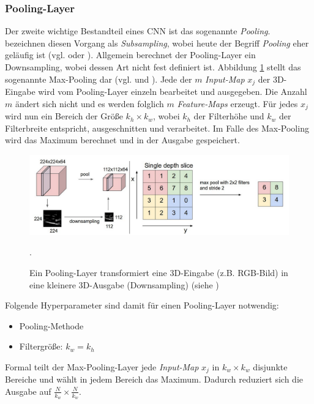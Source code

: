 \subsubsection{Pooling-Layer}
Der zweite wichtige Bestandteil eines CNN ist das sogenannte \textit{Pooling}. \cite{LeCun1998} bezeichnen diesen Vorgang als \textit{Subsampling}, wobei heute der Begriff \textit{Pooling} eher geläufig ist (vgl. \cite{Zeiler2013b} oder \cite{Glorot2011}).
Allgemein berechnet der Pooling-Layer ein Downsampling, wobei dessen Art nicht fest definiert ist. Abbildung \ref{fig:3_cnn_subsampling} stellt das sogenannte Max-Pooling dar (vgl. \cite{Glorot2011} und \cite{Zeiler2011}). 
Jede der $m$ \textit{Input-Map} $x_j$ der 3D-Eingabe wird vom Pooling-Layer einzeln bearbeitet und ausgegeben. Die Anzahl $m$ ändert sich nicht und es werden folglich $m$ \textit{Feature-Maps} erzeugt.
Für jedes $x_j$ wird nun ein Bereich der Größe $k_h \times k_w$, wobei $k_h$ der Filterhöhe und $k_w$ der Filterbreite entspricht, ausgeschnitten und verarbeitet. Im Falle des Max-Pooling wird das Maximum berechnet und in der Ausgabe gespeichert.

\begin{figure}[H]
\centering
\includegraphics[width=0.95\linewidth]{images/3_cnn_subsampling}
\caption[Ein Pooling-Layer transformiert eine 3D-Eingabe (z.B. RGB-Bild) in eine kleinere 3D-Ausgabe (Downsampling)]{Ein Pooling-Layer transformiert eine 3D-Eingabe (z.B. RGB-Bild) in eine kleinere 3D-Ausgabe (Downsampling) (siehe \cite{Kaparthy2014})}.
\label{fig:3_cnn_subsampling}
\end{figure}

Folgende Hyperparameter sind damit für einen Pooling-Layer notwendig:
\begin{itemize}
\item Pooling-Methode
\item Filtergröße: $k_w = k_h$
\end{itemize}

Formal teilt der Max-Pooling-Layer jede \textit{Input-Map} $x_j$ in $k_w \times k_w$ disjunkte Bereiche und wählt in jedem Bereich das Maximum.
Dadurch reduziert sich die Ausgabe auf $ \frac{N}{k_w} \times \frac{N}{k_w}$.

